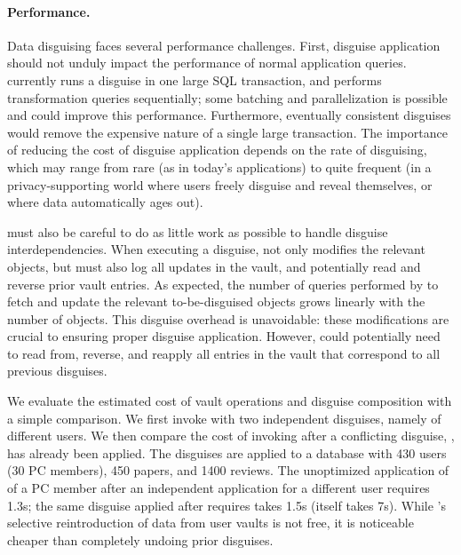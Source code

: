\paragraph{Performance.}
\label{sec:perf}

Data disguising faces several performance challenges.
%
First, disguise application should not unduly impact the performance of normal application queries.
\sys currently runs a disguise in one large SQL transaction, and performs transformation queries
sequentially; some batching and parallelization is possible and could improve this performance.
Furthermore, eventually consistent disguises would remove the expensive nature of a single large
transaction.  The importance of reducing the cost of disguise application depends on the rate of
disguising, which may range from rare (as in today's applications) to quite frequent (in a
privacy-supporting world where users freely disguise and reveal themselves, or where data
automatically ages out).

%
\sys must also be careful to do as little work as possible to handle disguise interdependencies.
When executing a disguise, \sys not only modifies the relevant objects, but must also
log all updates in the vault, and potentially read and reverse prior vault entries.
%
As expected, the number of queries performed by \sys to fetch and update the relevant to-be-disguised objects
grows linearly with the number of objects. This disguise overhead is unavoidable: these
modifications are crucial to ensuring proper disguise application.
However, \sys could potentially need to read from, reverse, and reapply all entries in the vault
that correspond to all previous disguises.

We evaluate the estimated cost of vault operations and disguise composition with a simple
comparison. We first invoke \sys with two independent disguises, namely \hrtbf of different
users. We then compare the cost of invoking \hrtbf after a conflicting disguise, \hconfanon, has
already been applied.
The disguises are applied to a database with 430 users (30 PC members), 450 papers, and 1400
reviews.
The unoptimized application of \hrtbf of a PC member after an independent \hrtbf application for a different user requires 1.3s;
the same \hrtbf disguise applied after \hconfanon requires takes 1.5s (\hconfanon itself takes
7s). While \sys's selective reintroduction of data from user vaults is not free, it is noticeable
cheaper than completely undoing prior disguises.
